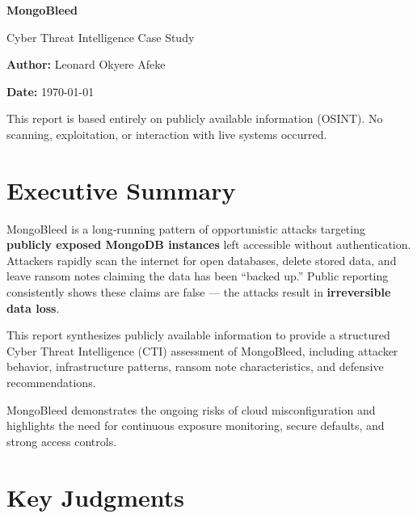 \documentclass[12pt]{article}
\begin{document}
	
	\begin{titlepage}
		\centering
		\vspace*{3cm}
		{\Huge \textbf{MongoBleed}}\par
		\vspace{0.5cm}
		{\Large Cyber Threat Intelligence Case Study}\par
		\vspace{1.5cm}
		
		{\large \textbf{Author:} Leonard Okyere Afeke}\par
		\vspace{0.3cm}
		{\large \textbf{Date:} \today}\par
		\vspace{2cm}
		
		\vfill
		{\small This report is based entirely on publicly available information (OSINT). 
			No scanning, exploitation, or interaction with live systems occurred.}
	\end{titlepage}
	
	\section*{Executive Summary}
	
	MongoBleed is a long‑running pattern of opportunistic attacks targeting \textbf{publicly exposed MongoDB instances} left accessible without authentication.  
	Attackers rapidly scan the internet for open databases, delete stored data, and leave ransom notes claiming the data has been “backed up.” Public reporting consistently shows these claims are false — the attacks result in \textbf{irreversible data loss}.
	
	This report synthesizes publicly available information to provide a structured Cyber Threat Intelligence (CTI) assessment of MongoBleed, including attacker behavior, infrastructure patterns, ransom note characteristics, and defensive recommendations.
	
	MongoBleed demonstrates the ongoing risks of cloud misconfiguration and highlights the need for continuous exposure monitoring, secure defaults, and strong access controls.
	
	\section{Key Judgments}
	
\end{document}
